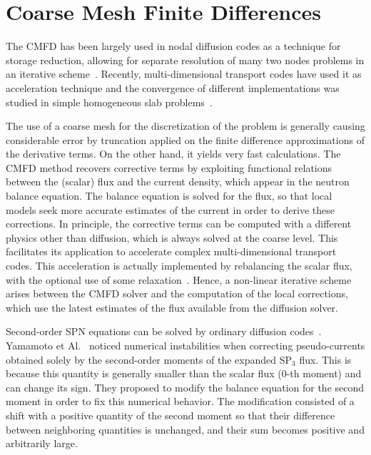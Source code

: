 \section{Coarse Mesh Finite Differences}
\label{sec:CMFD-intro}

The CMFD has been largely used in nodal diffusion codes as a technique for storage reduction, allowing for separate resolution of many two nodes problems in an iterative scheme~\cite{Smith-1983,Lawrence-1986}. Recently, multi-dimensional transport codes have used it as acceleration technique and the convergence of different implementations was studied in simple homogeneous slab problems~\cite{Jarrett-2016,Shen-2019}.

The use of a coarse mesh for the discretization of the problem is generally causing considerable error by truncation applied on the finite difference approximations of the derivative terms. On the other hand, it yields very fast calculations. The CMFD method recovers corrective terms by exploiting functional relations between the (scalar) flux and the current density, which appear in the neutron balance equation. The balance equation is solved for the flux, so that local models seek more accurate estimates of the current in order to derive these corrections. In principle, the corrective terms can be computed with a different physics other than diffusion, which is always solved at the coarse level. This facilitates its application to accelerate complex multi-dimensional transport codes. This acceleration is actually implemented by rebalancing the scalar flux, with the optional use of some relaxation~\cite{Park-2017}. Hence, a non-linear iterative scheme arises between the CMFD solver and the computation of the local corrections, which use the latest estimates of the flux available from the diffusion solver.

Second-order SPN equations can be solved by ordinary diffusion codes~\cite{Larsen-1993}. Yamamoto et Al.~\cite{Yamamoto-2016} noticed numerical instabilities when correcting pseudo-currents obtained solely by the second-order moments of the expanded SP$_3$ flux. This is because this quantity is generally smaller than the scalar flux (0-th moment) and can change its sign. They proposed to modify the balance equation for the second moment in order to fix this numerical behavior. The modification consisted of a shift with a positive quantity of the second moment so that their difference between neighboring quantities is unchanged, and their sum becomes positive and arbitrarily large.

